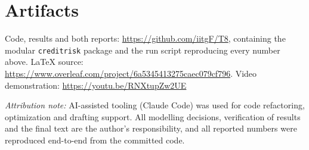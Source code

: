 \documentclass[a4paper,twocolumn,10pt]{article}
\begin{document}
\section{Artifacts}

Code, results and both reports: \url{https://github.com/iitgF/T8}, containing the modular \texttt{creditrisk} package and the run script reproducing every number above. LaTeX source: \url{https://www.overleaf.com/project/6a5345413275caec079cf796}. Video demonstration: \url{https://youtu.be/RNXtupZw2UE}

\vspace{1mm}
\noindent\textit{Attribution note:} AI-assisted tooling (Claude Code) was used for code refactoring, optimization and drafting support. All modelling decisions, verification of results and the final text are the author's responsibility, and all reported numbers were reproduced end-to-end from the committed code.
\end{document}
